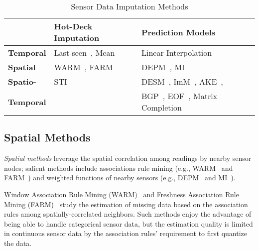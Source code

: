 
\begin{table}
\caption{Sensor Data Imputation Methods}
\label{tbl:methods}
\centering
{\small
\begin{tabular}{|l|l|l|} \hline
   &{\bf Hot-Deck Imputation}&{\bf Prediction Models}\\ \hline
{\bf Temporal} & Last-seen~\cite{Granger:lastseen}, Mean & Linear Interpolation\\ \hline
{\bf Spatial} & WARM~\cite{le2005estimating}, FARM~\cite{Gruenwald:FARM} & DEPM~\cite{li2008data}, MI~\cite{yuan2000multiple}\\\hline
{\bf Spatio-} & STI~\cite{Jian-Zhong:STI} & DESM~\cite{li2008data}, ImM~\cite{Lim:robust}, AKE~\cite{pan2010k},\\
{\bf Temporal} && BGP~\cite{osborne2012real}, EOF~\cite{beckers2003eof, kondrashov2006spatio}, Matrix Completion~\cite{majumdar2011increasing}\\
 \hline \end{tabular}
}
\vspace{-0.1in}
\end{table}

\subsection{Spatial Methods}\label{subsec:sm}
{\em Spatial methods} leverage the spatial correlation among readings
by nearby sensor nodes; salient methods include associations rule
mining (e.g., WARM~\cite{le2005estimating} and
FARM~\cite{Gruenwald:FARM}) 
and weighted functions of nearby sensors (e.g., DEPM~\cite{li2008data}
and MI~\cite{yuan2000multiple}).


Window Association Rule Mining (WARM)~\cite{le2005estimating} and Freshness Association Rule Mining (FARM)~\cite{Gruenwald:FARM} study the estimation of missing data based on the association rules among spatially-correlated neighbors. 
Such methods enjoy the advantage of being able to handle categorical sensor data, but the 
estimation quality is limited in continuous sensor data by the association rules' requirement to 
first quantize the data.

